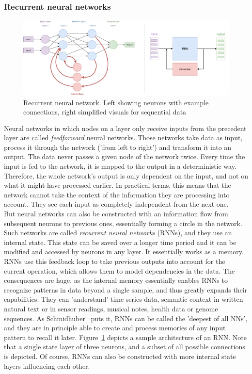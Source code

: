 \documentclass[
a4paper,
pagesize,
pdftex,
12pt,
ngerman,
fleqn,
final,
]{scrartcl}
\begin{document}
	\subsubsection{Recurrent neural networks}\label{RNN}
	\begin{figure}[ht]
		\centering
		\includegraphics[width=\linewidth]{img/RecurrentNeuralNetwork}
		\caption{Recurrent neural network. Left showing neurons with example connections, right simplified visuals for sequential data}
		\label{fig:rnn}
	\end{figure}
	Neural networks in which nodes on a layer only receive inputs from the precedent layer are called \textit{feedforward} neural networks. Those networks take data as input, process it through the network ('from left to right') and transform it into an output. The data never passes a given node of the network twice. Every time the input is fed to the network, it is mapped to the output in a deterministic way. Therefore, the whole network's output is only dependent on the input, and not on what it might have processed earlier. In practical terms, this means that the network cannot take the context of the information they are processing into account. They see each input as completely independent from the next one.\\
	But neural networks can also be constructed with an information flow from subsequent neurons to previous ones, essentially forming a circle in the network. Such networks are called \textit{recurrent neural networks} (RNNs), and they use an internal state. This state can be saved over a longer time period and it can be modified and accessed by neurons in any layer. It essentially works as a memory. RNNs use this feedback loop to take previous outputs into account for the current operation, which allows them to model dependencies in the data. The consequences are huge, as the internal memory essentially enables RNNs to recognize patterns in data beyond a single sample, and thus greatly expands their capabilities. They can 'understand' time series data, semantic context in written natural text or in sensor readings, musical notes, health data or genome sequences. As Schmidhuber~\cite{Schmidhuber.2015} puts it, RNNs can be called the 'deepest of all NNs', and they are in principle able to create and process memories of any input pattern to recall it later. Figure~\ref{fig:rnn} depicts a sample architecture of an RNN. Note that a single state layer of three neurons, and a subset of all possible connections is depicted. Of course, RNNs can also be constructed with more internal state layers influencing each other.\\
\end{document}
